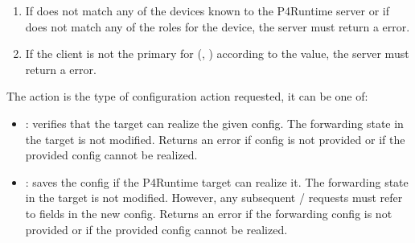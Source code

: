\documentclass[11pt]{article}
\begin{document}
{%
\begin{enumerate}%

\item{}
If  does not match any of the devices known to the P4Runtime
server or if  does not match any of the roles for the device, the
server must return a  error.%

\item{}
If the client is not the primary for (, ) according to
the  value, the server must return a  error.%
\end{enumerate}%

\noindent{}The action is the type of configuration action requested, it can be one of:%

\begin{itemize}%

\item{}
: verifies that the target can realize the given config. The
forwarding state in the target is not modified. Returns an 
error if config is not provided or if the provided config cannot be realized.%

\item{}
: saves the config if the P4Runtime target can realize
it. The forwarding state in the target is not modified. However, any
subsequent  /  requests must refer to fields in the new
config. Returns an  error if the forwarding config is not
provided or if the provided config cannot be realized.%


\end{itemize}}
\end{document}
